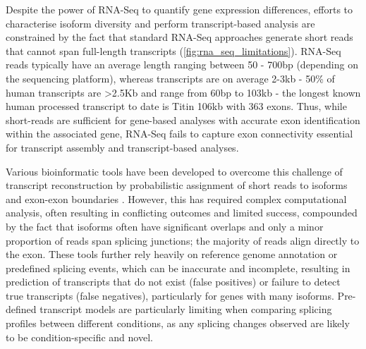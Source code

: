 Despite the power of RNA-Seq to quantify gene expression differences, efforts to characterise isoform diversity and perform transcript-based analysis are constrained by the fact that standard RNA-Seq approaches generate short reads that cannot span full-length transcripts (\cref{fig:rna_seq_limitations}). RNA-Seq reads typically have an average length ranging between 50 - 700bp (depending on the sequencing platform), whereas transcripts are on average 2-3kb - 50\% of human transcripts are >2.5Kb\cite{Sharon2013} and range from 60bp to 103kb \cite{Piovesan2016,Sharon2013} - the longest known human processed transcript to date is Titin 106kb with 363 exons\cite{Bang2001}. Thus, while short-reads are sufficient for gene-based analyses with accurate exon identification within the associated gene, RNA-Seq fails to capture exon connectivity essential for transcript assembly and transcript-based analyses\cite{Gordon2015}\cite{Wang2016}. 

Various bioinformatic tools have been developed to overcome this challenge of transcript reconstruction by probabilistic assignment of short reads to isoforms and exon-exon boundaries \cite{Trapnell2010, Kingsford2010, Au2013}. However, this has required complex computational analysis, often resulting in conflicting outcomes and limited success\cite{Steijger2013}, compounded by the fact that isoforms often have significant overlaps and only a minor proportion of reads span splicing junctions; the majority of reads align directly to the exon. These tools further rely heavily on reference genome annotation or predefined splicing events, which can be inaccurate and incomplete, resulting in prediction of transcripts that do not exist (false positives) or failure to detect true transcripts (false negatives), particularly for genes with many isoforms\cite{Au2013}. Pre-defined transcript models are particularly limiting when comparing splicing profiles between different conditions, as any splicing changes observed are likely to be condition-specific and novel. 


